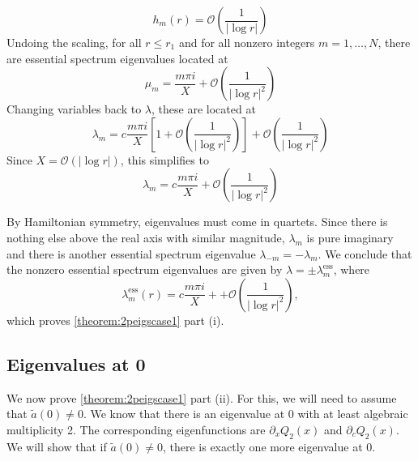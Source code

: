 \documentclass[thesis.tex]{subfiles}
\begin{document}
\[
h_m(r) = \mathcal{O}\left( \frac{1}{|\log r|} \right)
\]
Undoing the scaling, for all $r \leq r_1$ and for all nonzero integers $m = 1, \dots, N$, there are essential spectrum eigenvalues located at
\[
\mu_m = \frac{m \pi i}{X} + \mathcal{O}\left( \frac{1}{|\log r|^2} \right)
\]
Changing variables back to $\lambda$, these are located at
\[
\lambda_m = c \frac{m \pi i}{X}\left[1 + \mathcal{O}\left( \frac{1}{|\log r|^2} \right) \right] +\mathcal{O}\left( \frac{1}{|\log r|^2} \right)
\]
Since $X = \mathcal{O}(|\log r|)$, this simplifies to
\[
\lambda_m = c \frac{m \pi i}{X} +\mathcal{O}\left( \frac{1}{|\log r|^2} \right)
\]

By Hamiltonian symmetry, eigenvalues must come in quartets. Since there is nothing else above the real axis with similar magnitude, $\lambda_m$ is pure imaginary and there is another essential spectrum eigenvalue $\lambda_{-m} = -\lambda_m$. We conclude that the nonzero essential spectrum eigenvalues are given by $\lambda = \pm \lambda_m^{\text{ess}}$, where
\[
\lambda_m^{\text{ess}}(r) = c \frac{m \pi i}{X} + +\mathcal{O}\left( \frac{1}{|\log r|^2} \right),
\]
which proves \cref{theorem:2peigscase1} part (i).

\subsection{Eigenvalues at 0}

We now prove \cref{theorem:2peigscase1} part (ii). For this, we will need to assume that $\tilde{a}(0) \neq 0$. We know that there is an eigenvalue at 0 with at least algebraic multiplicity 2. The corresponding eigenfunctions are $\partial_x Q_2(x)$ and $\partial_c Q_2(x)$. We will show that if $\tilde{a}(0) \neq 0$, there is exactly one more eigenvalue at 0.
\end{document}
